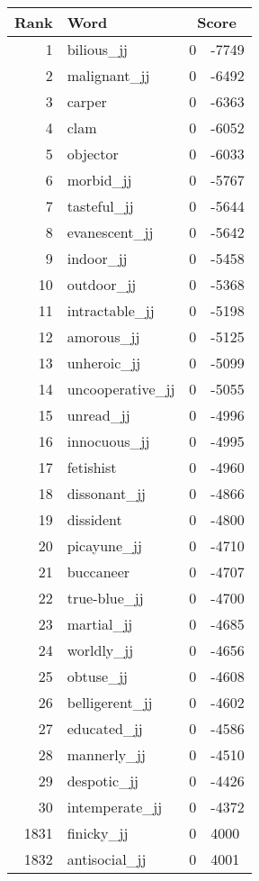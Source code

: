 \begin{longtable}[!htbp]{| rlr@{.}l |}
    \hline
    \textbf{Rank} & \textbf{Word} & \multicolumn{2}{c|}{\textbf{Score}} \\
    \hline
    \endhead
    1 & bilious\_jj & 0 & -7749 \\
    2 & malignant\_jj & 0 & -6492 \\
    3 & carper & 0 & -6363 \\
    4 & clam & 0 & -6052 \\
    5 & objector & 0 & -6033 \\
    6 & morbid\_jj & 0 & -5767 \\
    7 & tasteful\_jj & 0 & -5644 \\
    8 & evanescent\_jj & 0 & -5642 \\
    9 & indoor\_jj & 0 & -5458 \\
    10 & outdoor\_jj & 0 & -5368 \\
    11 & intractable\_jj & 0 & -5198 \\
    12 & amorous\_jj & 0 & -5125 \\
    13 & unheroic\_jj & 0 & -5099 \\
    14 & uncooperative\_jj & 0 & -5055 \\
    15 & unread\_jj & 0 & -4996 \\
    16 & innocuous\_jj & 0 & -4995 \\
    17 & fetishist & 0 & -4960 \\
    18 & dissonant\_jj & 0 & -4866 \\
    19 & dissident & 0 & -4800 \\
    20 & picayune\_jj & 0 & -4710 \\
    21 & buccaneer & 0 & -4707 \\
    22 & true-blue\_jj & 0 & -4700 \\
    23 & martial\_jj & 0 & -4685 \\
    24 & worldly\_jj & 0 & -4656 \\
    25 & obtuse\_jj & 0 & -4608 \\
    26 & belligerent\_jj & 0 & -4602 \\
    27 & educated\_jj & 0 & -4586 \\
    28 & mannerly\_jj & 0 & -4510 \\
    29 & despotic\_jj & 0 & -4426 \\
    30 & intemperate\_jj & 0 & -4372 \\
    1831 & finicky\_jj & 0 & 4000 \\
    1832 & antisocial\_jj & 0 & 4001 \\

\end{longtable}

